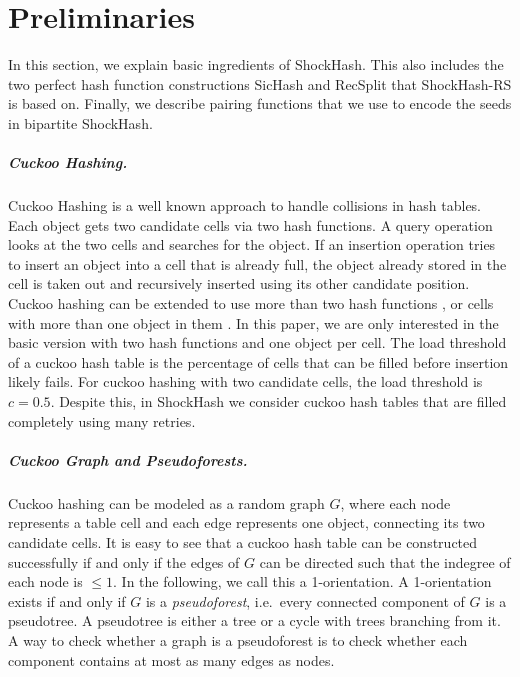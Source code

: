 \documentclass[a4paper,USenglish,cleveref]{lipics-v2021}
\newcommand{\myparagraph}[1]{\subparagraph*{#1}}
\begin{document}
\section{Preliminaries}\label{s:prelim}
In this section, we explain basic ingredients of ShockHash.
This also includes the two perfect hash function constructions SicHash \cite{lehmann2023sichash} and RecSplit \cite{esposito2020recsplit} that ShockHash-RS is based on.
Finally, we describe pairing functions that we use to encode the seeds in bipartite ShockHash.

\myparagraph{Cuckoo Hashing.}
Cuckoo Hashing \cite{pagh2004cuckoo} is a well known approach to handle collisions in hash tables.
Each object gets two candidate cells via two hash functions.
A query operation looks at the two cells and searches for the object.
If an insertion operation tries to insert an object into a cell that is already full, the object already stored in the cell is taken out and recursively inserted using its other candidate position.
Cuckoo hashing can be extended to use more than two hash functions \cite{fotakis2005space}, or cells with more than one object in them \cite{dietzfelbinger2007balanced}.
In this paper, we are only interested in the basic version with two hash functions and one object per cell.
\label{s:loadThresholds}
The load threshold of a cuckoo hash table \cite{L:A_New_Approach:2012,FKP:The_Multiple:2011,fountoulakis2012sharp} is the percentage of cells that can be filled before insertion likely fails.
For cuckoo hashing with two candidate cells, the load threshold is $c=0.5$.
Despite this, in ShockHash we consider cuckoo hash tables that are filled completely using many retries.

\myparagraph{Cuckoo Graph and Pseudoforests.} \label{s:pseudotrees}
Cuckoo hashing can be modeled as a random graph $G$, where each node represents a table cell and each edge represents one object, connecting its two candidate cells.
It is easy to see that a cuckoo hash table can be constructed successfully if and only if the edges of $G$ can be directed such that the indegree of each node is $\leq 1$.
In the following, we call this a 1-orientation.
A 1-orientation exists if and only if $G$ is a \emph{pseudoforest}, i.e.\ every connected component of $G$ is a pseudotree.
A pseudotree is either a tree or a cycle with trees branching from it.
A way to check whether a graph is a pseudoforest is to check whether each component contains at most as many edges as nodes.
\end{document}
